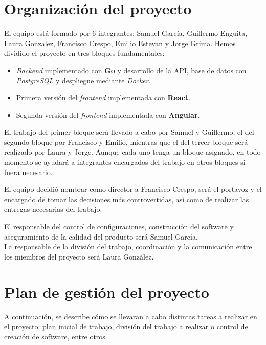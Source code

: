 \documentclass[11pt, a4paper, titlepage]{article}
\begin{document}
\section{Organización del proyecto}
El equipo está formado por 6 integrantes: Samuel García, Guillermo Enguita, Laura Gonzalez, Francisco Crespo, Emilio Estevan y Jorge Grima.
Hemos dividido el proyecto en tres bloques fundamentales:\newline
\begin{itemize}
    \item \textit{Backend} implementado con \textbf{Go} y desarrollo de la API, base de datos con \textit{PostgreSQL} y despliegue mediante \textit{Docker}.
    \item Primera versión del \textit{frontend} implementada con \textbf{React}.
    \item Segunda versión del \textit{frontend} implementada con \textbf{Angular}.\newline
\end{itemize}

El trabajo del primer bloque será llevado a cabo por Samuel y Guillermo, el del segundo bloque por Francisco y Emilio, mientras que el del tercer bloque será realizado por Laura y Jorge. 
Aunque cada uno tenga un bloque asignado, en todo momento se ayudará a integrantes encargados del trabajo en otros bloques si fuera necesario. \newline

El equipo decidió nombrar como director a Francisco Crespo, será el portavoz y el encargado de tomar las decisiones más controvertidas, así como de realizar las entregas necesarias del trabajo.\newline

El responsable del control de configuraciones, construcción del software y aseguramiento de la calidad del producto será Samuel García.\\

La responsable de la división del trabajo, coordinación y la comunicación entre los miembros del proyecto será Laura González.

\section{Plan de gestión del proyecto}

A continuación, se describe cómo se llevaran a cabo distintas tareas a realizar en el proyecto: plan inicial de trabajo, división del trabajo a realizar o control de creación de software, entre otros.
\end{document}
